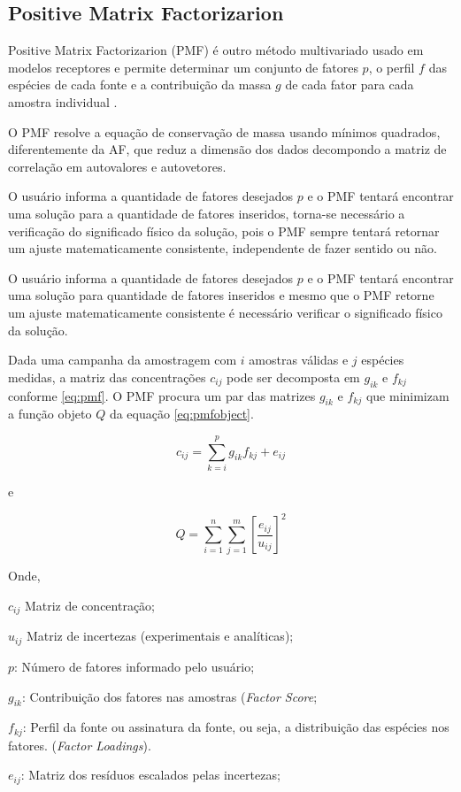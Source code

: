 \subsection{Positive Matrix Factorizarion}

Positive Matrix Factorizarion (PMF) é outro método multivariado usado
em modelos receptores e permite determinar um conjunto de fatores $p$, 
o perfil $f$ das espécies de cada fonte e a contribuição da massa $g$ de cada fator 
para cada amostra individual \citep{norris2014}. 

O PMF resolve a equação de conservação de massa usando mínimos 
quadrados, diferentemente da AF, que reduz a dimensão dos 
dados decompondo a matriz de correlação em autovalores e autovetores. 

O usuário informa a quantidade de fatores desejados $p$ e o PMF 
tentará encontrar uma solução para a quantidade de fatores inseridos, 
torna-se necessário a verificação do significado físico da solução, pois 
o PMF sempre tentará retornar um ajuste matematicamente consistente,
independente de fazer sentido ou não.

O usuário informa a quantidade de fatores desejados $p$ e o PMF 
tentará encontrar uma solução para quantidade de fatores inseridos e 
mesmo que o PMF retorne um ajuste matematicamente consistente 
é necessário verificar o significado físico da solução.

Dada uma campanha da amostragem com $i$ amostras válidas e 
$j$ espécies medidas, a matriz das concentrações $c_{ij}$ 
pode ser decomposta em $g_{ik}$ e $f_{kj}$ conforme \ref{eq:pmf}. 
O PMF procura um par das matrizes $g_{ik}$ e $f_{kj}$ que
minimizam a função objeto $Q$ da equação \ref{eq:pmfobject}. 

\begin{equation}
  c_{ij} = \sum_{k=i}^p g_{ik}f_{kj} + e_{ij}
  \label{eq:pmf}
\end{equation}

e

\begin{equation}
  Q = \sum_{i=1}^n \sum_{j=1}^m  \left[ \frac{e_{ij}} {u_{ij}} \right] ^2
  \label{eq:pmfobject}
\end{equation}

Onde,
\begin{itemize}
  \begin{spacing}{1.0}
	\item $c_{ij}$ Matriz de concentração;
	\item $u_{ij}$ Matriz de incertezas (experimentais e analíticas);
	\item $p$: Número de fatores informado pelo usuário;
	\item $g_{ik}$: Contribuição dos fatores nas amostras (\textit{Factor Score};
	\item $f_{kj}$: Perfil da fonte ou assinatura da fonte, ou seja, 
	a distribuição das espécies nos fatores. (\textit{Factor Loadings}).
	\item $e_{ij}$: Matriz dos resíduos escalados pelas incertezas;
  \end{spacing}
\end{itemize}


